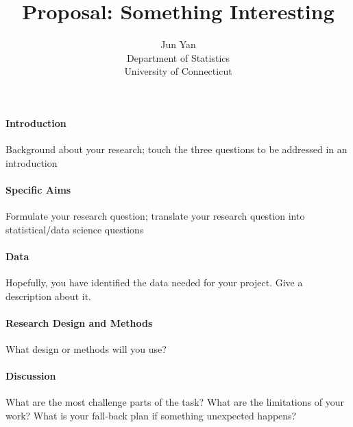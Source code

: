 \documentclass[12pt]{article}
\title{Proposal: Something Interesting}
\author{Jun Yan\\
  Department of Statistics\\
  University of Connecticut
}
\begin{document}
\maketitle


\paragraph{Introduction}
Background about your research; touch the three questions to be addressed in an
introduction

\lipsum[1]

\paragraph{Specific Aims}
Formulate your research question;
translate your research question into statistical/data science questions

\lipsum[2]

\paragraph{Data}
Hopefully, you have identified the data needed for your project. Give a
description about it.

\lipsum[3]

\paragraph{Research Design and Methods}
What design or methods will you use?


\lipsum[4]

\paragraph{Discussion}
What are the most challenge parts of the task?
What are the limitations of your work? What is your fall-back plan if
something unexpected happens?

\lipsum[5]



\end{document}
